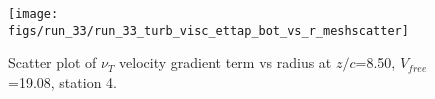 \begin{figure}[H]
\centering
\texttt{[image: figs/run\_33/run\_33\_turb\_visc\_ettap\_bot\_vs\_r\_meshscatter]}
\caption{Scatter plot of $\nu_T$ velocity gradient term vs radius at $z/c$=8.50, $V_{free}$=19.08, station 4.}
\label{fig:run_33_turb_visc_ettap_bot_vs_r_meshscatter}
\end{figure}



